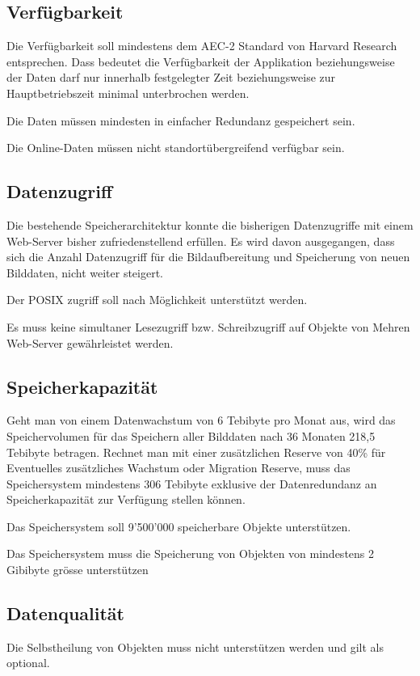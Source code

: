 \subsection{Verfügbarkeit}
Die Verfügbarkeit soll mindestens dem AEC-2 Standard von Harvard Research entsprechen. Dass bedeutet die Verfügbarkeit der Applikation beziehungsweise der Daten darf nur innerhalb festgelegter Zeit beziehungsweise zur Hauptbetriebszeit minimal unterbrochen werden.

Die Daten müssen mindesten in einfacher Redundanz gespeichert sein. 

Die Online-Daten müssen nicht standortübergreifend verfügbar sein.

\subsection{Datenzugriff}
Die bestehende Speicherarchitektur konnte die bisherigen Datenzugriffe mit einem Web-Server bisher zufriedenstellend erfüllen. Es wird davon ausgegangen, dass sich die Anzahl Datenzugriff für die Bildaufbereitung und Speicherung von neuen Bilddaten, nicht weiter steigert.

Der \gls{POSIX} zugriff soll nach Möglichkeit unterstützt werden.

Es muss keine simultaner Lesezugriff bzw. Schreibzugriff auf Objekte von Mehren Web-Server gewährleistet werden.

\subsection{Speicherkapazität}
Geht man von einem Datenwachstum von 6 Tebibyte pro Monat aus, wird das Speichervolumen für das Speichern aller Bilddaten nach 36 Monaten 218,5 Tebibyte betragen. Rechnet man mit einer zusätzlichen Reserve von 40\% für Eventuelles zusätzliches Wachstum oder Migration Reserve, muss das Speichersystem mindestens 306 Tebibyte exklusive der Datenredundanz an Speicherkapazität zur Verfügung stellen können.

Das Speichersystem soll 9'500'000 speicherbare Objekte unterstützen.

Das Speichersystem muss die Speicherung von Objekten von mindestens 2 Gibibyte grösse unterstützen

\subsection{Datenqualität}
Die Selbstheilung von Objekten muss nicht unterstützen werden und gilt als optional.

